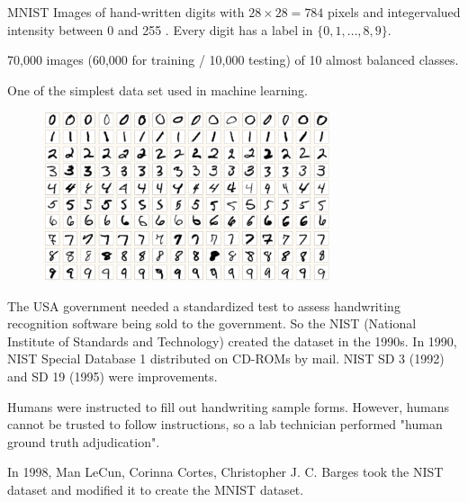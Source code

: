 \begin{frame}[allowframebreaks]

\begin{myconceptblock}{3.20}{MNIST}
    Images of hand-written digits with $28 \times 28=784$ pixels and integervalued intensity between 0 and 255 . Every digit has a label in $\{0,1, \ldots, 8,9\}$.

    70,000 images (60,000 for training / 10,000 testing) of 10 almost balanced classes.

    One of the simplest data set used in machine learning.

    \begin{figure}[H]
        \centering
        \includegraphics[width=0.75\textwidth]{.././assets/3.3.png}
    \end{figure}

    The USA government needed a standardized test to assess handwriting recognition software being sold to the government. So the NIST (National Institute of Standards and Technology) created the dataset in the 1990s. In 1990, NIST Special Database 1 distributed on CD-ROMs by mail. NIST SD 3 (1992) and SD 19 (1995) were improvements.

    Humans were instructed to fill out handwriting sample forms. However, humans cannot be trusted to follow instructions, so a lab technician performed "human ground truth adjudication".

    In 1998, Man LeCun, Corinna Cortes, Christopher J. C. Barges took the NIST dataset and modified it to create the MNIST dataset.
\end{myconceptblock}

\end{frame}

